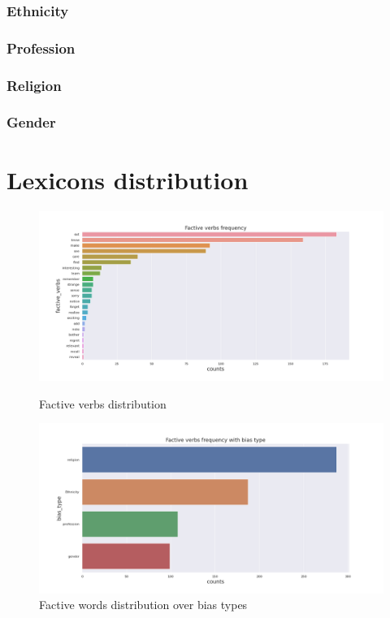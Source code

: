 \subsubsection{Ethnicity}
\subsubsection{Profession}
\subsubsection{Religion}
\subsubsection{Gender}
\section{Lexicons distribution}

\begin{figure}[h!]
\centering
\begin{minipage}{.5\textwidth}
  \centering
      \includegraphics[width=1\textwidth]{thesis/figures/lexicons/LexiconsFactive verbs frequency.png}
    \caption{Factive verbs distribution}
  \label{fig:test1}
\end{minipage}%
\begin{minipage}{.5\textwidth}
  \centering
    \includegraphics[width=1\textwidth]{thesis/figures/lexicons/LexiconsFactive verbs frequency with bias type.png}
    \caption{Factive words distribution over bias types}
  \label{fig:test2}
\end{minipage}
\end{figure}


